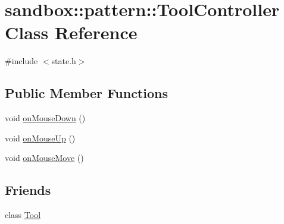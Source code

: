 \hypertarget{classsandbox_1_1pattern_1_1_tool_controller}{\section{sandbox\-:\-:pattern\-:\-:Tool\-Controller Class Reference}
\label{classsandbox_1_1pattern_1_1_tool_controller}
}


{\ttfamily \#include $<$state.\-h$>$}

\subsection*{Public Member Functions}
\begin{DoxyCompactItemize}
\item 
void \hyperlink{classsandbox_1_1pattern_1_1_tool_controller_a7359815a0e7e9b1ad8c67de16e93332e}{on\-Mouse\-Down} ()
\item 
void \hyperlink{classsandbox_1_1pattern_1_1_tool_controller_ab49ae3a1fc34dd6f3ee342b23b80243e}{on\-Mouse\-Up} ()
\item 
void \hyperlink{classsandbox_1_1pattern_1_1_tool_controller_a44369d355a9baaf94e5a64f75b64dade}{on\-Mouse\-Move} ()
\end{DoxyCompactItemize}
\subsection*{Friends}
\begin{DoxyCompactItemize}
\item 
class \hyperlink{classsandbox_1_1pattern_1_1_tool_controller_a76e9adf1d0321729d4b28ce85a6825fd}{Tool}
\end{DoxyCompactItemize}


